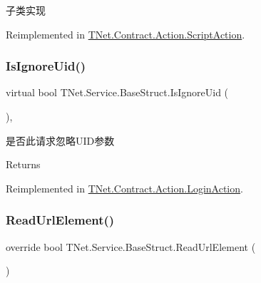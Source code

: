 子类实现 



Reimplemented in \mbox{\hyperlink{class_t_net_1_1_contract_1_1_action_1_1_script_action_a0e10cb82f7a96457248b836bcec83aa7}{T\+Net.\+Contract.\+Action.\+Script\+Action}}.

\mbox{\label{class_t_net_1_1_service_1_1_base_struct_ad113e67255dd3c3c625903fc746266b3}} 
\subsubsection{\texorpdfstring{Is\+Ignore\+Uid()}{IsIgnoreUid()}}
{\footnotesize\ttfamily virtual bool T\+Net.\+Service.\+Base\+Struct.\+Is\+Ignore\+Uid (\begin{DoxyParamCaption}{ }\end{DoxyParamCaption})\hspace{0.3cm}{\ttfamily [protected]}, {\ttfamily [virtual]}}



是否此请求忽略\+U\+I\+D参数 

\begin{DoxyReturn}{Returns}

\end{DoxyReturn}


Reimplemented in \mbox{\hyperlink{class_t_net_1_1_contract_1_1_action_1_1_login_action_ad0ee65777c20af8acea8da0f24c977cf}{T\+Net.\+Contract.\+Action.\+Login\+Action}}.

\mbox{\label{class_t_net_1_1_service_1_1_base_struct_afa4a4e036ed31b2f0d2eba3b2ed8a99c}} 
\subsubsection{\texorpdfstring{Read\+Url\+Element()}{ReadUrlElement()}}
{\footnotesize\ttfamily override bool T\+Net.\+Service.\+Base\+Struct.\+Read\+Url\+Element (\begin{DoxyParamCaption}{ }\end{DoxyParamCaption})\hspace{0.3cm}{\ttfamily [virtual]}}



